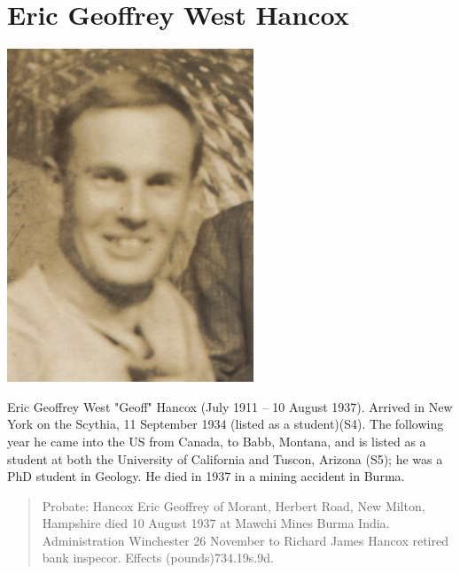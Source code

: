 \section{Eric Geoffrey West Hancox}\label{Eric_Geoffrey_West_Hancox}

\begin{center}
\includegraphics[width=0.8\linewidth]{Eric_Geoffrey_West_Hancox/portrait}
\end{center}

Eric Geoffrey West "Geoff" Hancox (July 1911 -- 10 August 1937). Arrived in New York on the Scythia, 11 September 1934 (listed as a student)(S4). The following year he came into the US from Canada, to Babb, Montana, and is listed as a student at both the University of California and Tuscon, Arizona (S5); he was a PhD student in Geology. He died in 1937 in a mining accident in Burma.

\begin{quotation}
Probate: Hancox Eric Geoffrey of Morant, Herbert Road, New Milton, Hampshire died 10 August 1937 at Mawchi Mines Burma India. Administration Winchester 26 November to Richard James Hancox retired bank inspecor. Effects (pounds)734.19s.9d.
\end{quotation}

